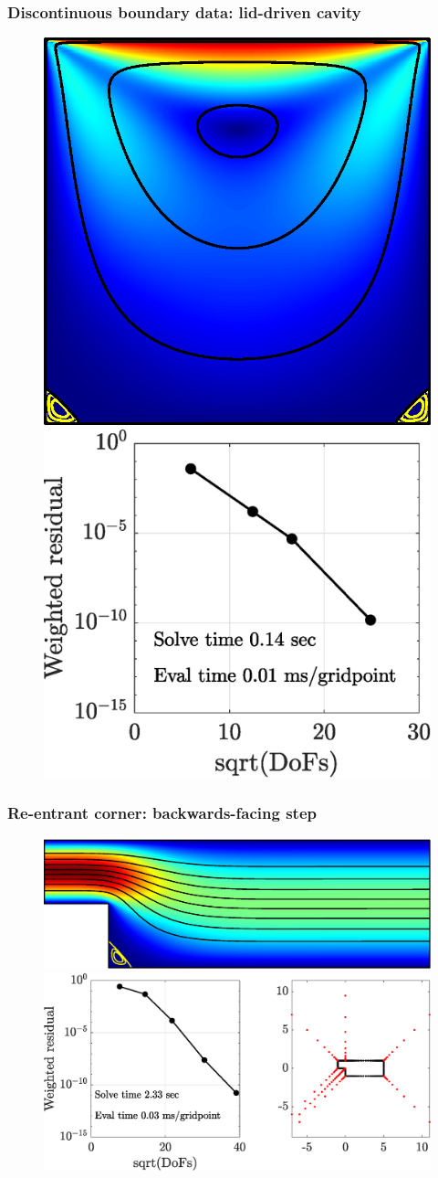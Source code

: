\begin{frame}
\frametitle{Discontinuous boundary data: lid-driven cavity}
\centering
\begin{figure}
\includegraphics[height=0.5\linewidth]{Figures/ldc_soln}
\includegraphics[height=0.4\linewidth]{Figures/ldc_conv}
\end{figure}
\end{frame}



\begin{frame}
\frametitle{Re-entrant corner: backwards-facing step}
\centering
\begin{figure}
	\includegraphics[height=0.3\linewidth]{Figures/step_soln}
	
	\includegraphics[height=0.3\linewidth]{Figures/step_conv}
\end{figure}
\end{frame}


